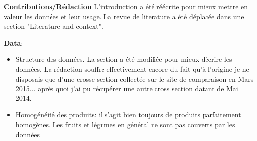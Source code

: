 \documentclass[11pt]{article}
\begin{document}
\textbf{Contributions/Rédaction} L'introduction a été réécrite pour mieux mettre en valeur les données et leur usage. La revue de literature a été déplacée dans une section "Literature and context".

\textbf{Data}: 
\begin{itemize}
\item Structure des données. La section a été modifiée pour mieux décrire les données. La rédaction souffre effectivement encore du fait qu'à l'origine je ne disposais que d'une crosse section collectée sur le site de comparaison en Mars 2015... après quoi j'ai pu récupérer une autre cross section datant de Mai 2014.
\item Homogénéité des produits: il s'agit bien toujours de produits parfaitement homogènes. Les fruits et légumes en général ne sont pas couverts par les données
\end{itemize}
\end{document}
